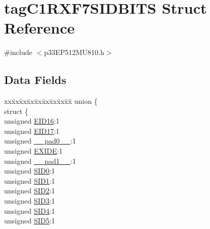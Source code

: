 \hypertarget{structtag_c1_r_x_f7_s_i_d_b_i_t_s}{}\section{tag\+C1\+R\+X\+F7\+S\+I\+D\+B\+I\+TS Struct Reference}
\label{structtag_c1_r_x_f7_s_i_d_b_i_t_s}


{\ttfamily \#include $<$p33\+E\+P512\+M\+U810.\+h$>$}

\subsection*{Data Fields}
\begin{DoxyCompactItemize}
\item 
\begin{tabbing}
xx\=xx\=xx\=xx\=xx\=xx\=xx\=xx\=xx\=\kill
union \{\\
\>struct \{\\
\>\>unsigned \hyperlink{structtag_c1_r_x_f7_s_i_d_b_i_t_s_a6dd5663b0c9838c56db040560ca0efa1}{EID16}:1\\
\>\>unsigned \hyperlink{structtag_c1_r_x_f7_s_i_d_b_i_t_s_aa648615464b0eb29967529333eee9fd9}{EID17}:1\\
\>\>unsigned \hyperlink{structtag_c1_r_x_f7_s_i_d_b_i_t_s_adf71f3d8410c1f1dbbc96680a92c49af}{\_\_pad0\_\_}:1\\
\>\>unsigned \hyperlink{structtag_c1_r_x_f7_s_i_d_b_i_t_s_a09ff1c1be3927220bd3dfbc10edfe243}{EXIDE}:1\\
\>\>unsigned \hyperlink{structtag_c1_r_x_f7_s_i_d_b_i_t_s_acaf2d0924a107ec6e8d2e31febaf66f9}{\_\_pad1\_\_}:1\\
\>\>unsigned \hyperlink{structtag_c1_r_x_f7_s_i_d_b_i_t_s_a1ca276ac15df60e1f7b9a6d0011ade93}{SID0}:1\\
\>\>unsigned \hyperlink{structtag_c1_r_x_f7_s_i_d_b_i_t_s_a3405d354f81391f879648f69f504dfc8}{SID1}:1\\
\>\>unsigned \hyperlink{structtag_c1_r_x_f7_s_i_d_b_i_t_s_ad744966dfc49307f731b7045b01b94e5}{SID2}:1\\
\>\>unsigned \hyperlink{structtag_c1_r_x_f7_s_i_d_b_i_t_s_a9345f3e64720be93e83d8dfc827f3f45}{SID3}:1\\
\>\>unsigned \hyperlink{structtag_c1_r_x_f7_s_i_d_b_i_t_s_aefb106fed4bb40e2c3c71ac612c554e3}{SID4}:1\\
\>\>unsigned \hyperlink{structtag_c1_r_x_f7_s_i_d_b_i_t_s_a0f221b3c9612231686bf87ccdcec8489}{SID5}:1\\

\end{tabbing}
\end{DoxyCompactItemize}
